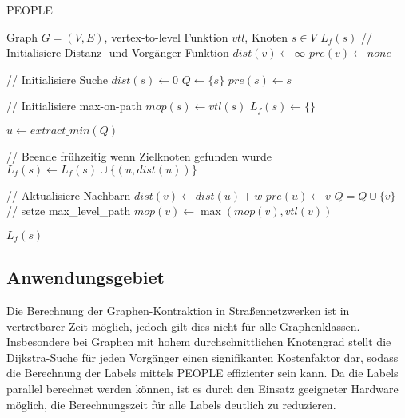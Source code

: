 \begin{algorithm}[p]
  \caption{PEOPLE}
  \begin{algorithmic}[1]
    \Require Graph $G = (V, E)$, vertex-to-level Funktion ${vtl}$, Knoten $s \in V$
    \Ensure $L_f (s)$
    \State // Initialisiere Distanz- und Vorgänger-Funktion
    \State ${dist}(v) \leftarrow \infty$
    \State ${pre}(v) \leftarrow {none}$
    \EndFor

    \State
    \State // Initialisiere Suche
    \State ${dist}(s) \leftarrow 0$
    \State $Q\leftarrow \{ s \}$
    \State ${pre}(s) \leftarrow s$

    \State
    \State // Initialisiere max-on-path
    \State ${mop}(s) \leftarrow {vtl}(s)$
    \State $L_f (s) \leftarrow \{ \}$

    \State
    \State $u \leftarrow{extract\_min}(Q)$

    \State
    \State // Beende frühzeitig wenn Zielknoten gefunden wurde
    \State $L_f (s) \leftarrow L_f (s) \cup \{ (u, {dist}(u)) \}$
    \EndIf

    \State
    \State // Aktualisiere Nachbarn
    \State ${dist}(v) \leftarrow {dist}(u) + w$
    \State ${pre}(u) \leftarrow v$
    \State $Q = Q \cup \{ v \}$
    \State
    \State // setze max\_level\_path
    \State ${mop}(v) \leftarrow \max({mop}(v), {vtl}(v))$
    \EndIf
    \EndFor

    \EndWhile

    \State
    \State \Return $L_f (s)$
  \end{algorithmic}
  \label{alg:people:people}
\end{algorithm}

\subsection{Anwendungsgebiet}

Die Berechnung der Graphen-Kontraktion in Straßennetzwerken ist in vertretbarer Zeit möglich, jedoch gilt dies nicht für alle Graphenklassen. Insbesondere bei Graphen mit hohem durchschnittlichen Knotengrad stellt die Dijkstra-Suche für jeden Vorgänger einen signifikanten Kostenfaktor dar, sodass die Berechnung der Labels mittels PEOPLE effizienter sein kann.
Da die Labels parallel berechnet werden können, ist es durch den Einsatz geeigneter Hardware möglich, die Berechnungszeit für alle Labels deutlich zu reduzieren.

